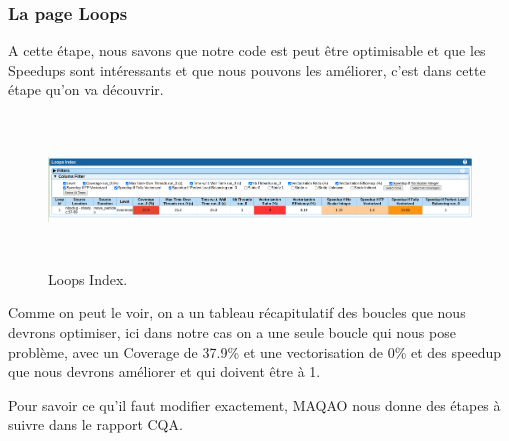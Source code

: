 \documentclass[a4paper, 12pt, twoside]{article}
\begin{document}
   \subsubsection*{La page Loops}
   A cette étape, nous savons que notre code est peut être optimisable et que les Speedups sont intéressants et que nous pouvons les améliorer, c'est dans cette étape qu'on va découvrir.
            \begin{figure}[h]
    \centering
    \includegraphics[width=\textwidth,height=4cm]{Figures/cap3.png}
    \caption{Loops Index.}
    
    \end{figure}
    \newpage
    
    
   Comme on peut le voir, on a un tableau récapitulatif des boucles que nous devrons optimiser, ici dans notre cas on a une seule boucle qui nous pose problème, avec un Coverage de 37.9\% et une vectorisation de 0\% et des speedup que nous devrons améliorer et qui doivent être à 1.
   
   
   Pour savoir ce qu'il faut modifier exactement, MAQAO nous donne des étapes à suivre dans le rapport CQA.
   
\end{document}

